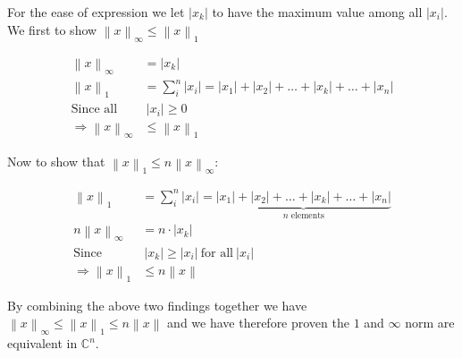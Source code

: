 \documentclass[11pt]{article}
\providecommand{\norm}[1]{\left\lVert #1 \right\rVert}
\providecommand{\len}[1]{\left| #1 \right|}
\begin{document}
For the ease of expression we let $\len{x_k}$ to have the maximum value among all $\len{x_i}$. We first to show $\norm{x}_{\infty} \leq \norm{x}_1 $

\begin{align*}
    \norm{x}_{\infty} &= \len{x_k} \\
    \norm{x}_1 &= \sum_i^n \len{x_i} = \len{x_1} + \len{x_2} + \dots + \len{x_k} + \dots + \len{x_n} \\
    \text{Since all} &\ \len{x_i} \geq 0 \\
    \Longrightarrow \norm{x}_{\infty} &\leq \norm{x}_1
\end{align*}

Now to show that $\norm{x}_1 \leq n\norm{x}_{\infty}$:

\begin{align*}
    \norm{x}_1 &= \sum_i^n \len{x_i} = \underbrace{\len{x_1} + \len{x_2} + \dots + \len{x_k} + \dots + \len{x_n}}_{\text{$n$ elements}} \\
    n\norm{x}_{\infty} &= n \cdot \len{x_k} \\
    \text{Since} &\ \len{x_k} \geq \len{x_i} \ \text{for all} \ \len{x_i}\\
    \Longrightarrow \norm{x}_1 &\leq n\norm{x}
\end{align*}

By combining the above two findings together we have $\norm{x}_{\infty} \leq \norm{x}_1  \leq n\norm{x}$ and we have therefore proven the $1$ and $\infty$ norm are equivalent in $\mathbb{C}^n$.
\end{document}
